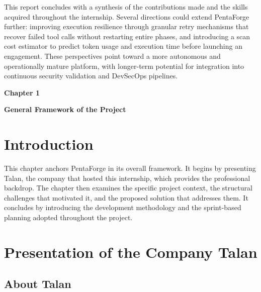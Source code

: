 \documentclass[12pt,a4paper]{report}
\begin{document}
\vspace{0.8cm}

This report concludes with a synthesis of the contributions made and the skills acquired
throughout the internship. Several directions could extend PentaForge further: improving
execution resilience through granular retry mechanisms that recover failed tool calls
without restarting entire phases, and introducing a scan cost estimator to predict token
usage and execution time before launching an engagement. These perspectives point toward
a more autonomous and operationally mature platform, with longer-term potential for
integration into continuous security validation and DevSecOps pipelines.
\newpage
\pagestyle{chapterone}

\vspace*{2cm}

{\fontsize{26}{30}\selectfont \textbf{Chapter 1}}\par

\vspace{1cm}

{\LARGE\bfseries General Framework of the Project}

\vspace{0.8cm}

\setcounter{chapter}{1}
\setcounter{section}{0}

\section{Introduction}

This chapter anchors PentaForge in its overall framework. It begins by presenting
Talan, the company that hosted this internship, which provides the professional backdrop.
The chapter then examines the specific project context, the structural challenges that
motivated it, and the proposed solution that addresses them. It concludes by introducing
the development methodology and the sprint-based planning adopted throughout the project.

\section{Presentation of the Company Talan}

\subsection{About Talan}
\end{document}
